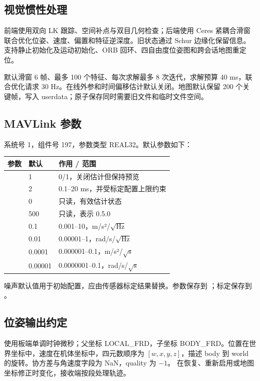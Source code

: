 \subsection{视觉惯性处理}
前端使用双向 LK 跟踪、空间补点与双目几何检查；后端使用 Ceres 紧耦合滑窗联合优化位姿、速度、偏置和特征逆深度。旧状态通过 Schur 边缘化保留信息。支持静止初始化及运动初始化、ORB 回环、四自由度位姿图和跨会话地图重定位。

默认滑窗 6 帧、最多 100 个特征、每次求解最多 8 次迭代，求解预算 40 ms，联合优化请求 30 Hz。在线外参和时间偏移估计默认关闭。地图默认保留 200 个关键帧，写入 userdata；原子保存同时需要旧文件和临时文件空间。

\subsection{MAVLink 参数}
系统号 1，组件号 197，参数类型 REAL32。默认参数如下：
\par\noindent\begin{tabularx}{\linewidth}{@{}p{36mm}p{15mm}Y@{}}\toprule
参数 & 默认 & 作用 / 范围\\\midrule
{} & 1 & 0/1，关闭估计但保持预览\\
 & 2 & 0.1--20 ms，并受标定配置上限约束\\
 & 0 & 只读，有效估计状态\\
 & 500 & 只读，表示 0.5.0\\
 & 0.1 & 0.001--10，m/s²/$\sqrt{\mathrm{Hz}}$\\
 & 0.01 & 0.00001--1，rad/s/$\sqrt{\mathrm{Hz}}$\\
 & 0.0001 & 0.000001--0.1，m/s²/$\sqrt{\mathrm{s}}$\\
 & 0.00001 & 0.0000001--0.1，rad/s/$\sqrt{\mathrm{s}}$\\\bottomrule
\end{tabularx}\par

噪声默认值用于初始配置，应由传感器标定结果替换。参数保存到 ；标定保存到 。

\subsection{位姿输出约定}
 使用板端单调时钟微秒；父坐标 LOCAL\_FRD，子坐标 BODY\_FRD。位置在世界坐标中，速度在机体坐标中，四元数顺序为 $[w,x,y,z]$，描述 body 到 world 的旋转。协方差与角速度字段为 NaN，quality 为 $-1$。 在恢复、重新启用或地图坐标修正时变化，接收端按段处理轨迹。
\newpage
